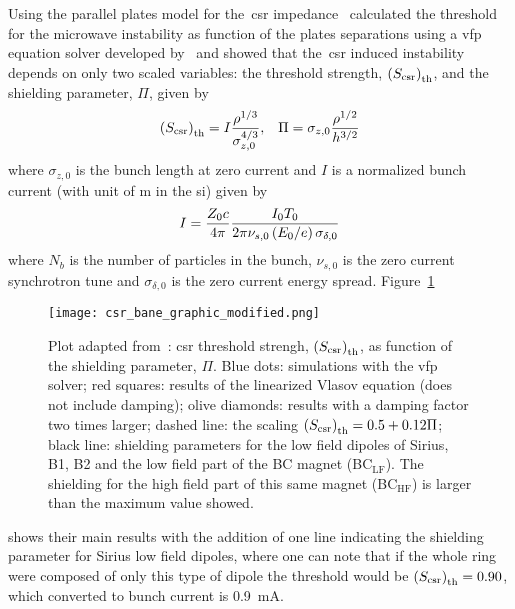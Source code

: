     \def \Scsr {\fof{S_\text{csr}}_\text{th}}
    Using the parallel plates model for the~\gls{csr} impedance~ calculated the threshold for the microwave instability as function of the plates separations using a \gls{vfp} equation solver developed by~ and showed that the~\gls{csr} induced instability depends on only two scaled variables: the threshold strength, $\Scsr$, and the shielding parameter, $\Pi$, given by
    \begin{align}\label{eq:csr_shielding_strength}
        \Scsr = I\frac{\rho^{1/3}}{\sigma_{z,0}^{4/3}}, & &  \Pi = \sigma_{z,0}\frac{\rho^{1/2}}{h^{3/2}}
    \end{align}
    where $\sigma_{z,0}$ is the bunch length at zero current and $I$ is a normalized bunch current (with unit of \si{\meter} in the \gls{si}) given by
    \begin{align}\label{eq:normalized_current}
        I = \frac{Z_0c}{4\pi}\frac{I_0T_0}{2\pi\nu_{s,0}\left(E_0/e\right)\sigma_{\delta,0}}
    \end{align}
    where $N_b$ is the number of particles in the bunch, $\nu_{s,0}$ is the zero current synchrotron tune and $\sigma_{\delta,0}$ is the zero current energy spread. Figure~\ref{fig:csr_bane_graphic_modified}
    \begin{figure}[b!]
        \centering
        \texttt{[image: csr\_bane\_graphic\_modified.png]}
        \caption[CSR driven longitudinal instability (adapted from~).]{Plot adapted from~: \gls{csr} threshold strengh, $\Scsr$, as function of the shielding parameter, $\Pi$. Blue dots: simulations with the \gls{vfp} solver; red squares: results of the linearized Vlasov equation (does not include damping); olive diamonds: results with a damping factor two times larger; dashed line: the scaling $\Scsr = 0.5 + 0.12\Pi$; black line: shielding parameters for the low field dipoles of Sirius, B1, B2 and the low field part of the BC magnet (BC$_\text{LF}$). The shielding for the high field part of this same magnet (BC$_\text{HF}$) is larger than the maximum value showed.}
        \label{fig:csr_bane_graphic_modified}
    \end{figure}
    shows their main results with the addition of one line indicating the shielding parameter for Sirius low field dipoles, where one can note that if the whole ring were composed of only this type of dipole the threshold would be $\Scsr=0.90$, which converted to bunch current is \SI{0.9}{\milli\ampere}.

